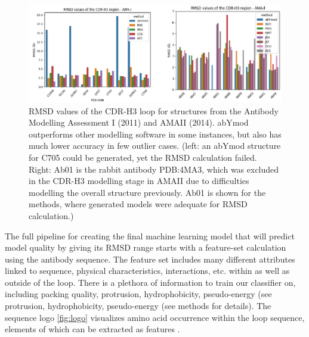 \documentclass[12pt]{article}
\begin{document}
\begin{figure}
  \centering
  \includegraphics[scale=0.3]{AMA.eps}
  \caption {RMSD values of the CDR-H3 loop for structures from the
    Antibody Modelling Assessment I (2011) and AMAII (2014). abYmod
    outperforms other modelling software in some instances, but also
    has much lower accuracy in few outlier cases. (left: an abYmod
    structure for C705 could be generated, yet the RMSD calculation
    failed. Right: Ab01 is the rabbit antibody PDB:4MA3, which was
    excluded in the CDR-H3 modelling stage in AMAII due to
    difficulties modelling the overall structure previously. Ab01 is
    shown for the methods, where generated models were adequate for
    RMSD calculation.)}
  \label{fig:AMA}
\end{figure}

The full pipeline for creating the final machine learning model that
will predict model quality by giving its RMSD range starts with a
feature-set calculation using the antibody sequence. The feature set
includes many different attributes linked to sequence, physical
characteristics, interactions, etc. within as well as outside of the
loop. There is a plethora of information to train our classifier on,
including packing quality, protrusion, hydrophobicity, pseudo-energy
(see protrusion, hydrophobicity, pseudo-energy (see methods for
details). The sequence logo \ref{fig:logo} visualizes amino acid
occurrence within the loop sequence, elements of which can be
extracted as features \cite{Thomsen2012,Shaner1993}.
\end{document}
